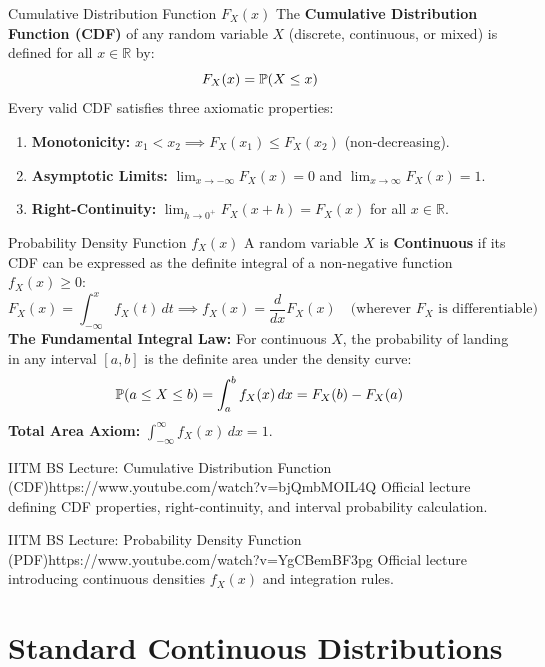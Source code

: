 \begin{definitionbox}{Cumulative Distribution Function $F_X(x)$}
The \textbf{Cumulative Distribution Function (CDF)} of any random variable $X$ (discrete, continuous, or mixed) is defined for all $x \in \mathbb{R}$ by:
$$F_X(x) = \P(X \le x)$$
Every valid CDF satisfies three axiomatic properties:
\begin{enumerate}
    \item \textbf{Monotonicity:} $x_1 < x_2 \implies F_X(x_1) \le F_X(x_2)$ (non-decreasing).
    \item \textbf{Asymptotic Limits:} $\lim_{x \to -\infty} F_X(x) = 0$ and $\lim_{x \to \infty} F_X(x) = 1$.
    \item \textbf{Right-Continuity:} $\lim_{h \to 0^+} F_X(x + h) = F_X(x)$ for all $x \in \mathbb{R}$.
\end{enumerate}
\end{definitionbox}

\begin{definitionbox}{Probability Density Function $f_X(x)$}
A random variable $X$ is \textbf{Continuous} if its CDF can be expressed as the definite integral of a non-negative function $f_X(x) \ge 0$:
$$F_X(x) = \int_{-\infty}^{x} f_X(t) \, dt \implies f_X(x) = \frac{d}{dx} F_X(x) \quad \text{(wherever } F_X \text{ is differentiable)}$$
\textbf{The Fundamental Integral Law:} For continuous $X$, the probability of landing in any interval $[a, b]$ is the definite area under the density curve:
$$\P(a \le X \le b) = \int_{a}^{b} f_X(x) \, dx = F_X(b) - F_X(a)$$
\textbf{Total Area Axiom:} $\int_{-\infty}^{\infty} f_X(x) \, dx = 1$.
\end{definitionbox}

\begin{videocard}{IITM BS Lecture: Cumulative Distribution Function (CDF)}{https://www.youtube.com/watch?v=bjQmbMOIL4Q}
Official lecture defining CDF properties, right-continuity, and interval probability calculation.
\end{videocard}

\begin{videocard}{IITM BS Lecture: Probability Density Function (PDF)}{https://www.youtube.com/watch?v=YgCBemBF3pg}
Official lecture introducing continuous densities $f_X(x)$ and integration rules.
\end{videocard}

\section{Standard Continuous Distributions}

